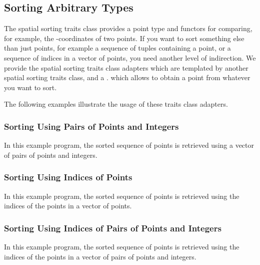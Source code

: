 \subsection{Sorting Arbitrary Types}
\label{sec:sort_any_type}
The spatial sorting traits class provides a point type and
functors for comparing, for example, the -coordinates
of two points.
%
If you want to sort something else than just points, for example
a sequence of tuples containing a point,  or a sequence of indices
in a vector of points, you need another level of indirection.
%
We provide the spatial sorting traits class adapters which are templated by
another spatial sorting traits class, and a 
.
which allows to obtain a point from whatever you want to sort. 

The following examples illustrate the usage of these traits class adapters.

\subsubsection{Sorting Using Pairs of Points and Integers}
\label{sec:sort_any_type_2}
In this example program, the sorted sequence of points is retrieved 
using a vector of pairs of points and integers.

\subsubsection{Sorting Using Indices of Points}
In this example program, the sorted sequence of points is retrieved 
using the indices of the points in a vector of points.

\subsubsection{Sorting Using Indices of Pairs of Points and Integers}
In this example program, the sorted sequence of points is retrieved 
using the indices of the points in a vector of pairs of points and integers.



